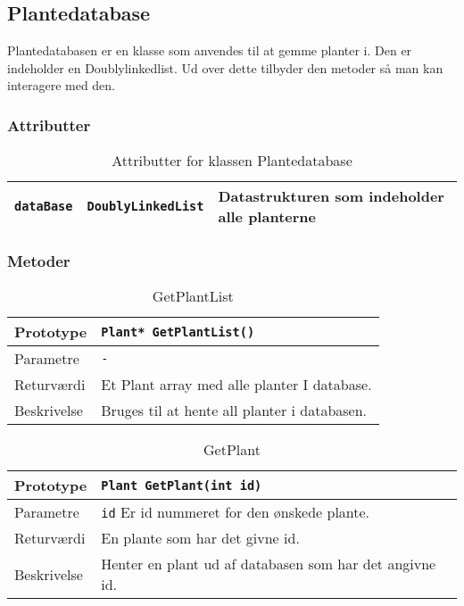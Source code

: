 \subsection{Plantedatabase}

Plantedatabasen er en klasse som anvendes til at gemme planter i. Den er indeholder en Doublylinkedlist. Ud over dette tilbyder den metoder så man kan interagere med den.


\subsubsection{Attributter}

\begin{table}[h]
\begin{tabularx}{\textwidth}{| L{2.5cm} | l | Z |} \hline
\texttt{dataBase} & \texttt{DoublyLinkedList} & Datastrukturen som indeholder alle planterne\\\hline
\end{tabularx}
\caption{Attributter for klassen Plantedatabase}
\label{table:Plantedatabase_attributter}
\end{table}

\subsubsection{Metoder}

\begin{table}[h]
\begin{tabularx}{\textwidth}{| L{2.5 cm} | Z |} \hline
Prototype & \texttt{Plant* GetPlantList()} \\\hline
Parametre & \texttt{-} \\\hline
Returværdi & Et Plant array med alle planter I database. \\\hline
Beskrivelse & Bruges til at hente all planter i databasen. \\\hline
\end{tabularx}
\caption{GetPlantList}
\label{table:Plantedatabase_GetPlantList}
\end{table}

\begin{table}[h]
\begin{tabularx}{\textwidth}{| L{2.5 cm} | Z |} \hline
Prototype & \texttt{Plant GetPlant(int id)} \\\hline
Parametre & \texttt{id} \newline
Er id nummeret for den ønskede plante. \\\hline
Returværdi & En plante som har det givne id. \\\hline
Beskrivelse & Henter en plant ud af databasen som har det angivne id. \\\hline
\end{tabularx}
\caption{GetPlant}
\label{table:Plantedatabase_GetPlant}
\end{table}


